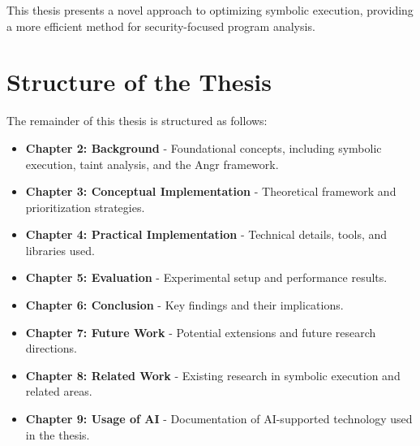 This thesis presents a novel approach to optimizing symbolic execution, providing a more efficient method for security-focused program analysis.

\section{Structure of the Thesis}

The remainder of this thesis is structured as follows:

\begin{itemize}
    \item \textbf{Chapter 2: Background} - Foundational concepts, including symbolic execution, taint analysis, and the Angr framework.
    \item \textbf{Chapter 3: Conceptual Implementation} - Theoretical framework and prioritization strategies.
    \item \textbf{Chapter 4: Practical Implementation} - Technical details, tools, and libraries used.
    \item \textbf{Chapter 5: Evaluation} - Experimental setup and performance results.
    \item \textbf{Chapter 6: Conclusion} - Key findings and their implications.
    \item \textbf{Chapter 7: Future Work} - Potential extensions and future research directions.
    \item \textbf{Chapter 8: Related Work} - Existing research in symbolic execution and related areas.
     \item \textbf{Chapter 9: Usage of AI} - Documentation of AI-supported technology used in the thesis.
\end{itemize}
